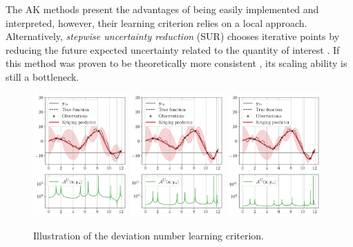 The AK methods present the advantages of being easily implemented and interpreted, however, their learning criterion relies on a local approach. 
Alternatively, \textit{stepwise uncertainty reduction} (SUR) chooses iterative points by reducing the future expected uncertainty related to the quantity of interest \citep{bect_ginsbourger_2012}. 
If this method was proven to be theoretically more consistent \citep{bect_ginsbourger_2019}, its scaling ability is still a bottleneck.  

\begin{figure}
    \centering
    \includegraphics[width=0.32\textwidth]{../numerical_experiments/chapter1/figures/contour_find_0.png}
    \includegraphics[width=0.32\textwidth]{../numerical_experiments/chapter1/figures/contour_find_1.png}
    \includegraphics[width=0.32\textwidth]{../numerical_experiments/chapter1/figures/contour_find_2.png}
    \caption{Illustration of the deviation number learning criterion.}
    \label{fig:AK_1D}
\end{figure}

